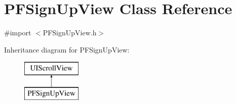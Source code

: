 \hypertarget{interface_p_f_sign_up_view}{}\section{P\+F\+Sign\+Up\+View Class Reference}
\label{interface_p_f_sign_up_view}


{\ttfamily \#import $<$P\+F\+Sign\+Up\+View.\+h$>$}

Inheritance diagram for P\+F\+Sign\+Up\+View\+:\begin{figure}[H]
\begin{center}
\leavevmode
\includegraphics[height=2.000000cm]{interface_p_f_sign_up_view}
\end{center}
\end{figure}
